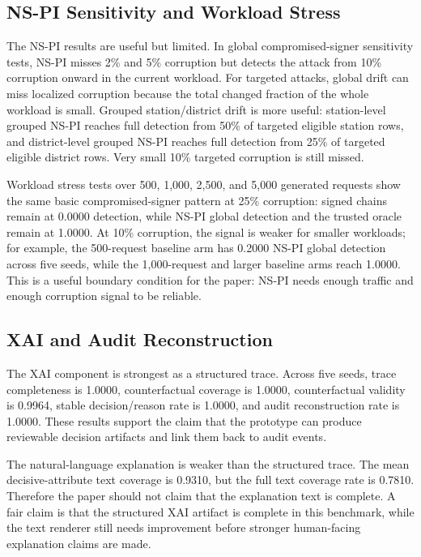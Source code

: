 \subsection{NS-PI Sensitivity and Workload Stress}

The NS-PI results are useful but limited. In global compromised-signer
sensitivity tests, NS-PI misses 2\% and 5\% corruption but detects the attack
from 10\% corruption onward in the current workload. For targeted attacks,
global drift can miss localized corruption because the total changed fraction
of the whole workload is small. Grouped station/district drift is more useful:
station-level grouped NS-PI reaches full detection from 50\% of targeted
eligible station rows, and district-level grouped NS-PI reaches full detection
from 25\% of targeted eligible district rows. Very small 10\% targeted
corruption is still missed.

Workload stress tests over 500, 1,000, 2,500, and 5,000 generated requests
show the same basic compromised-signer pattern at 25\% corruption: signed
chains remain at 0.0000 detection, while NS-PI global detection and the trusted
oracle remain at 1.0000. At 10\% corruption, the signal is weaker for smaller
workloads; for example, the 500-request baseline arm has 0.2000 NS-PI global
detection across five seeds, while the 1,000-request and larger baseline arms
reach 1.0000. This is a useful boundary condition for the paper: NS-PI needs
enough traffic and enough corruption signal to be reliable.

\subsection{XAI and Audit Reconstruction}

The XAI component is strongest as a structured trace. Across five seeds, trace
completeness is 1.0000, counterfactual coverage is 1.0000, counterfactual
validity is 0.9964, stable decision/reason rate is 1.0000, and audit
reconstruction rate is 1.0000. These results support the claim that the
prototype can produce reviewable decision artifacts and link them back to audit
events.

The natural-language explanation is weaker than the structured trace. The mean
decisive-attribute text coverage is 0.9310, but the full text coverage rate is
0.7810. Therefore the paper should not claim that the explanation text is
complete. A fair claim is that the structured XAI artifact is complete in this
benchmark, while the text renderer still needs improvement before stronger
human-facing explanation claims are made.

